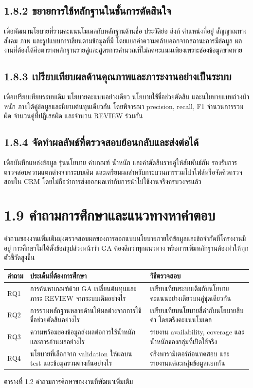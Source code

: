 \subsection*{1.8.2 ขยายการใช้หลักฐานในชั้นการตัดสินใจ}
เพื่อพัฒนานโยบายที่รวมคะแนนโมเดลกับหลักฐานด้านชื่อ ประวัติย่อ ลิงก์ ตำแหน่งที่อยู่ สัญญาณทางสังคม ภาพ และรูปแบบการเขียนตามข้อมูลที่มี โดยแยกค่าความคล้ายออกจากสถานะการมีข้อมูล ผลงานที่ต้องได้คือตารางหลักฐานรายคู่และสูตรการคำนวณที่ไม่ลดคะแนนเพียงเพราะช่องข้อมูลขาดหาย

\subsection*{1.8.3 เปรียบเทียบผลด้านคุณภาพและภาระงานอย่างเป็นระบบ}
เพื่อเปรียบเทียบระบบเดิม นโยบายคะแนนอย่างเดียว นโยบายใช้ชื่อช่วยตัดสิน และนโยบายแบบถ่วงน้ำหนัก ภายใต้คู่ข้อมูลและนิยามต้นทุนเดียวกัน โดยพิจารณา precision, recall, F1 จำนวนการรวมผิด จำนวนคู่ที่ปฏิเสธผิด และจำนวน REVIEW ร่วมกัน

\subsection*{1.8.4 จัดทำผลลัพธ์ที่ตรวจสอบย้อนกลับและส่งต่อได้}
เพื่อบันทึกแหล่งข้อมูล รุ่นนโยบาย ค่าเกณฑ์ น้ำหนัก และคำตัดสินรายคู่ให้สัมพันธ์กัน รองรับการตรวจสอบความแตกต่างจากระบบเดิม และเตรียมผลสำหรับกระบวนการรวมโปรไฟล์หรือจัดคิวตรวจสอบใน CRM โดยไม่ถือว่าการส่งออกผลเท่ากับการนำไปใช้งานจริงครบวงจรแล้ว

\section*{1.9 คำถามการศึกษาและแนวทางหาคำตอบ}
คำถามของงานเพิ่มเติมมุ่งตรวจสอบผลของการออกแบบนโยบายภายใต้ข้อมูลและข้อจำกัดที่โครงงานมีอยู่ การศึกษาไม่ได้ตั้งข้อสรุปล่วงหน้าว่า GA ต้องดีกว่าทุกแนวทาง หรือการเพิ่มหลักฐานต้องทำให้ทุกตัวชี้วัดสูงขึ้น

\begin{center}\small
\begin{tabularx}{\linewidth}{p{1.1cm}XX}
\toprule
คำถาม & ประเด็นที่ต้องการศึกษา & วิธีตรวจสอบ \\
\midrule
RQ1 & การค้นหาเกณฑ์ด้วย GA เปลี่ยนต้นทุนและภาระ REVIEW จากระบบเดิมอย่างไร & เปรียบเทียบระบบเดิมกับนโยบายคะแนนอย่างเดียวบนคู่ชุดเดียวกัน \\
RQ2 & การรวมหลักฐานหลายด้านให้ผลต่างจากการใช้ชื่อช่วยตัดสินอย่างไร & เปรียบเทียบนโยบายสี่ค่ากับนโยบายสิบค่า โดยตรึงคะแนนโมเดล \\
RQ3 & ความพร้อมของข้อมูลส่งผลต่อการใช้น้ำหนักและการอ่านผลอย่างไร & รายงาน availability, coverage และน้ำหนักของกลุ่มที่เปิดใช้จริง \\
RQ4 & นโยบายที่เลือกจาก validation ให้ผลบน test และข้อมูลรวมต่างกันอย่างไร & ตรึงพารามิเตอร์ก่อนทดสอบ และรายงานแต่ละกลุ่มข้อมูลแยกกัน \\
\bottomrule
\end{tabularx}
\par ตารางที่ 1.2 คำถามการศึกษาของงานที่พัฒนาเพิ่มเติม
\end{center}

